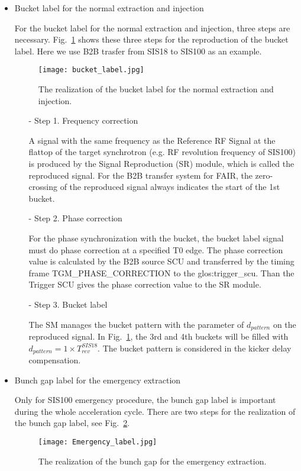 \begin{itemize}
\item Bucket label for the normal extraction and injection

For the bucket label for the normal extraction and injection, three steps are necessary. Fig.~\ref{bucket_label} shows these three steps for the reproduction of the bucket label. Here we use B2B trasfer from SIS18 to SIS100 as an example.
\begin{figure}[!htb]
   \centering   
   \texttt{[image: bucket\_label.jpg]}
   \caption{The realization of the bucket label for the normal extraction and injection.}
   \label{bucket_label}
\end{figure}  
\begin{itemize}
\item[-] Step 1. Frequency correction

A signal with the same frequency as the Reference RF Signal at the flattop of the target synchrotron (e.g. RF revolution frequency of SIS100) is produced by the Signal Reproduction (\gls{SR}) module, which is called the reproduced signal. For the B2B transfer system for FAIR, the zero-crossing of the reproduced signal always indicates the start of the 1st bucket.
\item[-] Step 2. Phase correction

For the phase synchronization with the bucket, the bucket label signal must do phase correction at a specified T0 edge. The phase correction value is calculated by the B2B source SCU and transferred by the timing frame TGM\_PHASE\_CORRECTION to the \gls{glos:trigger_scu}. Than the Trigger SCU gives the phase correction value to the SR module.

\item[-] Step 3. Bucket label

The SM manages the bucket pattern with the parameter of $d_{pattern}$ on the reproduced signal. In Fig.~\ref{bucket_label}, the 3rd and 4th buckets will be filled with $d_{pattern}=1\times T_{rev}^{SIS18}$. The bucket pattern is considered in the kicker delay compensation. 
\end{itemize}

\item Bunch gap label for the emergency extraction

Only for SIS100 emergency procedure, the bunch gap label is important during the whole acceleration cycle. There are two steps for the realization of the bunch gap label, see Fig.~\ref{Emergency_label}.
\begin{figure}[!htb]
   \centering   
   \texttt{[image: Emergency\_label.jpg]}
   \caption{The realization of the bunch gap for the emergency extraction.}
   \label{Emergency_label}
\end{figure} 


\end{itemize}
